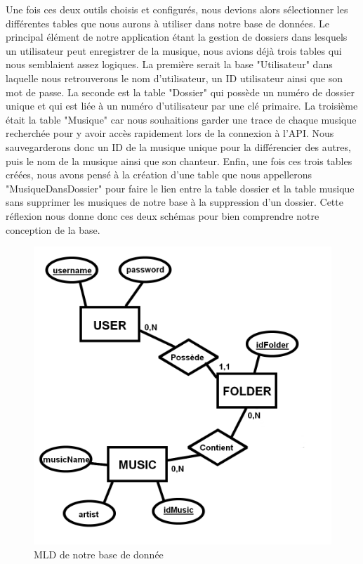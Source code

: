 \documentclass[12pt,french]{article}
\begin{document}
Une fois ces deux outils choisis et configurés, nous devions alors sélectionner les différentes tables que nous aurons à utiliser dans notre base de données. Le principal élément de notre application étant la gestion de dossiers dans lesquels un utilisateur peut enregistrer de la musique, nous avions déjà trois tables qui nous semblaient assez logiques. La première serait la base "Utilisateur" dans laquelle nous retrouverons le nom d'utilisateur, un ID utilisateur ainsi que son mot de passe. La seconde est la table "Dossier" qui possède un numéro de dossier unique et qui est liée à un numéro d'utilisateur par une clé primaire. La troisième était la table "Musique" car nous souhaitions garder une trace de chaque musique recherchée pour y avoir accès rapidement lors de la connexion à l'\gls{API}. Nous sauvegarderons donc un ID de la musique unique pour la différencier des autres, puis le nom de la musique ainsi que son chanteur. Enfin, une fois ces trois tables créées, nous avons pensé à la création d'une table que nous appellerons "MusiqueDansDossier" pour faire le lien entre la table dossier et la table musique sans supprimer les musiques de notre base à la suppression d'un dossier. Cette réflexion nous donne donc ces deux schémas pour bien comprendre notre conception de la base.

\begin{figure}[H]
	\centering
	\includegraphics[scale=0.3]{diag_database.png}
	\caption{MLD de notre base de donnée}    
\end{figure}
\end{document}
